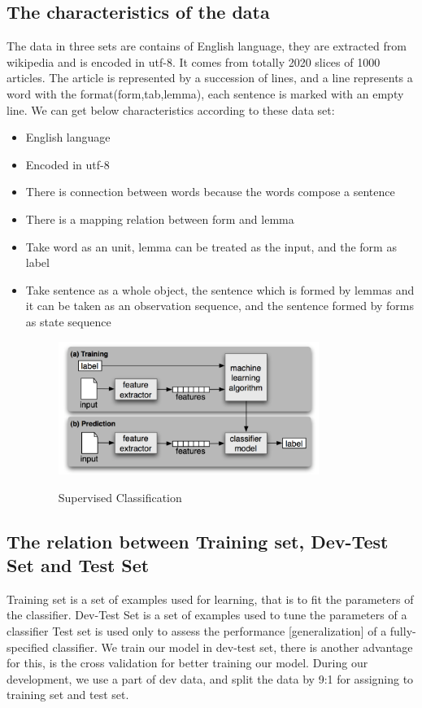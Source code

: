 \documentclass[a4paper]{article}
\begin{document}
\subsection{The characteristics of the data}
The data in three sets are contains of English language, they are extracted from wikipedia and is encoded in utf-8. It comes from totally 2020 slices of 1000 articles. The article is represented by a succession of lines, and a line represents a word with the format(form,tab,lemma), each sentence is marked with an empty line. We can get below characteristics according to these data set:
\begin{itemize}
\item English language
\item Encoded in utf-8
\item There is connection between words because the words compose a sentence
\item There is a mapping relation between form and lemma
\item Take word as an unit, lemma can be treated as the input, and the form as label
\item Take sentence as a whole object, the sentence which is formed by lemmas and it can be taken as an observation sequence, and the sentence formed by forms as state sequence

\begin{figure}[H]  
\centering
\includegraphics[width=0.8\textwidth]{process_flow.png}
\caption{Supervised Classification\protect\footnotemark}  
\cite{bird_natural_2009}
\end{figure}

\end{itemize}

\subsection{The relation between Training set, Dev-Test Set and Test Set}
Training set is a set of examples used for learning, that is to fit the parameters of the classifier. Dev-Test Set is a set of examples used to tune the parameters of a classifier
Test set is used only to assess the performance [generalization] of a fully-specified classifier. We train our model in dev-test set, there is another advantage for this, is the cross validation for better training our model. During our development, we use a part of dev data, and split the data by 9:1 for assigning to training set and test set.
\end{document}
